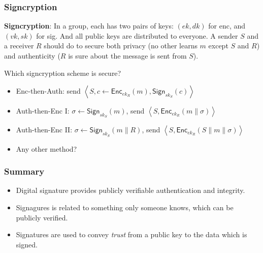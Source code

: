\begin{frame}\frametitle{Signcryption}
\textbf{Signcryption}: In a group, each has two pairs of keys: $(ek, dk)$ for enc, and $(vk, sk)$ for sig.
And all public keys are distributed to everyone.
A sender $S$ and a receiver $R$ should do to secure both privacy
(no other learns $m$ except $S$ and $R$) and authenticity
($R$ is sure about the message is sent from $S$).
\begin{exampleblock}{Which signcryption scheme is secure?}
\begin{itemize}
\item Enc-then-Auth: send $\left< S, c \leftarrow \mathsf{Enc}_{ek_R}(m), \mathsf{Sign}_{sk_S}(c) \right>$
\item Auth-then-Enc I: $\sigma \leftarrow \mathsf{Sign}_{sk_S}(m)$, send $\left< S, \mathsf{Enc}_{ek_R}(m\| \sigma) \right>$
\item Auth-then-Enc II: $\sigma \leftarrow \mathsf{Sign}_{sk_S}(m \| R)$, send $\left< S, \mathsf{Enc}_{ek_R}(S\| m \| \sigma) \right>$
\item Any other method?
\end{itemize}
\end{exampleblock}
\end{frame}
\begin{frame}\frametitle{Summary}
\begin{itemize}
\item Digital signature provides publicly verifiable authentication and integrity.
\item Signagures is related to something only someone knows, which can be publicly verified.
\item Signatures are used to convey \emph{trust} from a public key to the data which is signed.
\end{itemize}
\end{frame}

